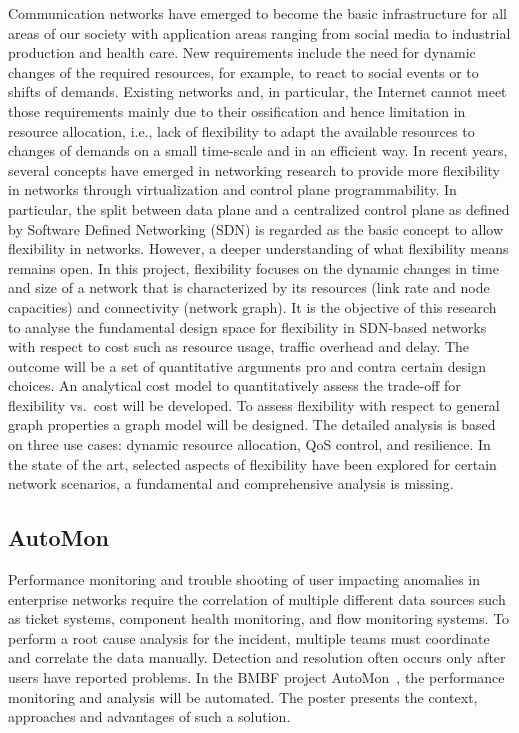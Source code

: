 Communication networks have emerged to become the basic infrastructure for all
areas of our society with application areas ranging from social media to
industrial production and health care. New requirements include the need for
dynamic changes of the required resources, for example, to react to social
events or to shifts of demands. Existing networks and, in particular, the
Internet cannot meet those requirements mainly due to their ossification and
hence limitation in resource allocation, i.e., lack of flexibility to adapt
the available resources to changes of demands on a small time-scale and in an
efficient way. In recent years, several concepts have emerged in networking
research to provide more flexibility in networks through virtualization and
control plane programmability. In particular, the split between data plane and
a centralized control plane as defined by Software Defined Networking (SDN) is
regarded as the basic concept to allow flexibility in networks. However, a
deeper understanding of what flexibility means remains open. In this project,
flexibility focuses on the dynamic changes in time and size of a network that
is characterized by its resources (link rate and node capacities) and
connectivity (network graph). It is the objective of this research to analyse
the fundamental design space for flexibility in SDN-based networks with
respect to cost such as resource usage, traffic overhead and delay. The
outcome will be a set of quantitative arguments pro and contra certain design
choices. An analytical cost model to quantitatively assess the trade-off for
flexibility vs.\ cost will be developed. To assess flexibility with respect to
general graph properties a graph model will be designed. The detailed analysis
is based on three use cases: dynamic resource allocation, QoS control, and
resilience. In the state of the art, selected aspects of flexibility have been
explored for certain network scenarios, a fundamental and comprehensive
analysis is missing.

\subsection{AutoMon}

Performance monitoring and trouble shooting of user impacting anomalies in
enterprise networks require the correlation of multiple different data sources
such as ticket systems, component health monitoring, and flow monitoring systems.
To perform a root cause analysis for the incident, multiple teams must
coordinate and correlate the data manually.
Detection and resolution often occurs only after users have reported problems.
In the BMBF project AutoMon~\cite{automon}, the performance monitoring and
analysis will be automated.
The poster presents the context, approaches and advantages of such a solution.
